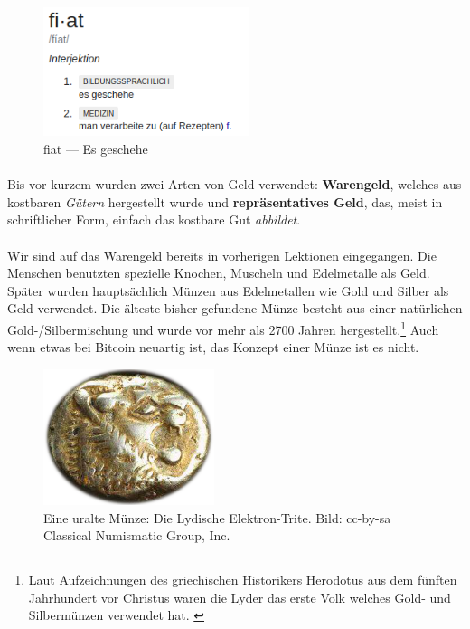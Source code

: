 \begin{figure}
  \centering
  \includegraphics[width=6cm]{assets/images/fiat-definition-de.png}
  \caption{fiat --- Es geschehe}
  \label{fig:fiat-definition}
\end{figure}

\paragraph{}
Bis vor kurzem wurden zwei Arten von Geld verwendet: \textbf{Warengeld}, welches
aus kostbaren \textit{Gütern} hergestellt wurde und \textbf{repräsentatives
Geld}, das, meist in schriftlicher Form, einfach das kostbare Gut
\textit{abbildet}.

\paragraph{}
Wir sind auf das Warengeld bereits in vorherigen Lektionen eingegangen. Die
Menschen benutzten spezielle Knochen, Muscheln und Edelmetalle als Geld. Später
wurden hauptsächlich Münzen aus Edelmetallen wie Gold und Silber als Geld
verwendet. Die älteste bisher gefundene Münze besteht aus einer natürlichen
Gold-/Silbermischung und wurde vor mehr als 2700 Jahren hergestellt.\footnote{
Laut Aufzeichnungen des griechischen Historikers Herodotus aus dem fünften
Jahrhundert vor Christus waren die Lyder das erste Volk welches Gold- und
Silbermünzen verwendet hat. \cite{coinage-origins}} Auch wenn etwas bei Bitcoin
neuartig ist, das Konzept einer Münze ist es nicht.

\begin{figure}
  \centering
  \includegraphics[width=5cm]{assets/images/lydian-coin-stater.png}
  \caption{Eine uralte Münze: Die Lydische Elektron-Trite. Bild: cc-by-sa Classical Numismatic Group, Inc.}
  \label{fig:lydian-coin-stater}
\end{figure}

